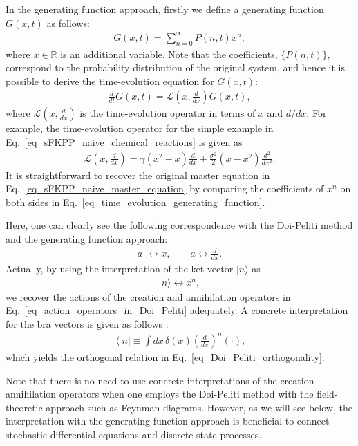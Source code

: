 \documentclass[sn-mathphys,Numbered]{sn-jnl}%
\theoremstyle{thmstyleone}%
\theoremstyle{thmstyletwo}%
\theoremstyle{thmstylethree}%
\begin{document}
In the generating function approach, firstly we define a generating function $G(x,t)$ as follows:
\begin{align}
G(x,t) = \sum_{n=0}^\infty P(n,t) x^n,
\end{align}
where $x \in \mathbb{R}$ is an additional variable. Note that the coefficients, $\{P(n,t)\}$, correspond to the probability distribution of the original system, and hence it is possible to derive the time-evolution equation for $G(x,t)$:
\begin{align}
\frac{d}{dt} G(x,t) = \mathcal{L}\left(x,\frac{d}{dx}\right) G(x,t),
\label{eq_time_evolution_generating_function}
\end{align}
where $\mathcal{L}\left(x,\frac{d}{dx}\right)$ is the time-evolution operator in terms of $x$ and $d/dx$. For example, the time-evolution operator for the simple example in Eq.~\eqref{eq_sFKPP_naive_chemical_reactions} is given as
\begin{align}
\mathcal{L}\left( x, \frac{d}{dx} \right) 
= \gamma (x^2-x) \frac{d}{dx} + \frac{\sigma^2}{2}(x-x^2) \frac{d^2}{dx^2}.
\end{align}
It is straightforward to recover the original master equation in Eq.~\eqref{eq_sFKPP_naive_master_equation} by comparing the coefficients of $x^n$ on both sides in Eq.~\eqref{eq_time_evolution_generating_function}.

Here, one can clearly see the following correspondence with the Doi-Peliti method and the generating function approach:
\begin{align}
a^\dagger \leftrightarrow x, \qquad a \leftrightarrow \frac{d}{dx}.
\label{eq_interpretation_with_generating_function_approach}
\end{align}
Actually, by using the interpretation of the ket vector $|n\rangle$ as
\begin{align}
| n \rangle \leftrightarrow x^n,
\label{eq_ket_generating_function}
\end{align}
we recover the actions of the creation and annihilation operators in Eq.~\eqref{eq_action_operators_in_Doi_Peliti} adequately.
A concrete interpretation for the bra vectors is given as follows \cite{Ohkubo2010}:
\begin{align}
\left\langle n \right\rvert \equiv
\int  dx \, \delta(x) \left( \frac{d}{dx} \right)^n (\cdot),
\end{align}
which yields the orthogonal relation in Eq.~\eqref{eq_Doi_Peliti_orthogonality}.


Note that there is no need to use concrete interpretations of the creation-annihilation operators when one employs the Doi-Peliti method with the field-theoretic approach such as Feynman diagrams. However, as we will see below, the interpretation with the generating function approach is beneficial to connect stochastic differential equations and discrete-state processes.
\end{document}
